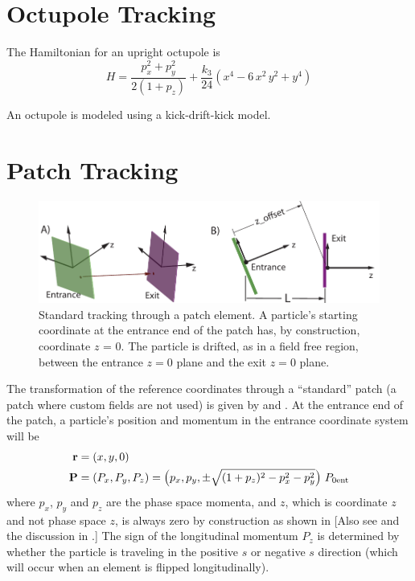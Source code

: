 \section{Octupole Tracking}
\label{s:octupole.std}

The Hamiltonian for an upright octupole is
\begin{equation}
  H = \frac{p_x^2 + p_y^2}{2 (1 + p_z)} + \frac{k_3}{24} (x^4 - 6 \, x^2 \, y^2 + y^4)
\end{equation}

An octupole is modeled using a kick-drift-kick model.

\section{Patch Tracking}
\label{s:patch.std}

\begin{figure}[tb]
  \centering
  \includegraphics[width=5in]{patch.pdf}
  \caption[Standard patch transformation.]
{Standard tracking through a patch element. A particle's starting coordinate at the entrance end of
the patch has, by construction, coordinate $z$ = 0. The particle is drifted, as in a field free
region, between the entrance $z = 0$ plane and the exit $z = 0$ plane.}
  \label{f:patch.track}
\end{figure}


The transformation of the reference coordinates through a ``standard'' patch (a patch where custom
fields are not used) is given by  and . At the entrance end of the patch, a
particle's position and momentum in the entrance coordinate system will be
\begin{alignat}{1}
  {\bf r} &= (x, y, 0) \nonumber \\
  {\bf P} &= (P_x, P_y, P_z) = 
    \left( p_x, p_y, \pm \sqrt{(1+p_z)^2 - p_x^2 - p_y^2} \right) \, P_{0\text{ent}}
\end{alignat}
where $p_x$, $p_y$ and $p_z$ are the phase space momenta, and $z$, which is coordinate $z$ and not
phase space $z$, is always zero by construction as shown in  [Also see
 and the discussion in .] The sign of the longitudinal
momentum $P_z$ is determined by whether the particle is traveling in the positive $s$ or negative
$s$ direction (which will occur when an element is flipped longitudinally).

